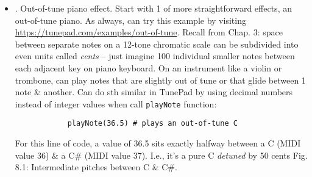 \documentclass{article}
\begin{document}
\begin{itemize}
	\begin{itemize}
		\item {. Out-of-tune piano effect.} Start with 1 of more straightforward effects, an out-of-tune piano. As always, can try this example by visiting \url{https://tunepad.com/examples/out-of-tune}. Recall from Chap. 3: space between separate notes on a 12-tone chromatic scale can be subdivided into even units called {\it cents} -- just imagine 100 individual smaller notes between each adjacent key on piano keyboard. On an instrument like a violin or trombone, can play notes that are slightly out of tune or that glide between 1 note \& another. Can do sth similar in TunePad by using decimal numbers instead of integer values when call {\tt playNote} function:
		\begin{verbatim}
			playNote(36.5) # plays an out-of-tune C
		\end{verbatim}
		For this line of code, a value of 36.5 sits exactly halfway between a C (MIDI value 36) \& a C\# (MIDI value 37). I.e., it's a pure C {\it detuned} by 50 cents {\sf Fig. 8.1: Intermediate pitches between C \& C\#}.
		

\end{itemize}
\end{itemize}
\end{document}
